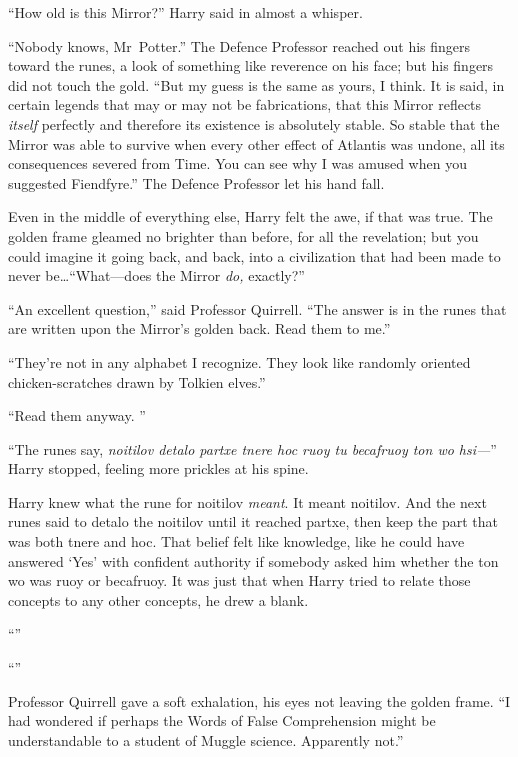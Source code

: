 “How old is this Mirror?” Harry said in almost a whisper.

“Nobody knows, Mr~Potter.” The Defence Professor reached out his fingers toward the runes, a look of something like reverence on his face; but his fingers did not touch the gold. “But my guess is the same as yours, I think. It is said, in certain legends that may or may not be fabrications, that this Mirror reflects \emph{itself} perfectly and therefore its existence is absolutely stable. So stable that the Mirror was able to survive when every other effect of Atlantis was undone, all its consequences severed from Time. You can see why I was amused when you suggested Fiendfyre.” The Defence Professor let his hand fall.

Even in the middle of everything else, Harry felt the awe, if that was true. The golden frame gleamed no brighter than before, for all the revelation; but you could imagine it going back, and back, into a civilization that had been made to never be…“What—does the Mirror \emph{do,} exactly?”

“An excellent question,” said Professor Quirrell. “The answer is in the runes that are written upon the Mirror’s golden back. Read them to me.”

“They’re not in any alphabet I recognize. They look like randomly oriented chicken-scratches drawn by Tolkien elves.”

“Read them anyway. ”

“The runes say, \emph{noitilov detalo partxe tnere hoc ruoy tu becafruoy ton wo hsi—}” Harry stopped, feeling more prickles at his spine.

Harry knew what the rune for noitilov \emph{meant}. It meant noitilov. And the next runes said to detalo the noitilov until it reached partxe, then keep the part that was both tnere and hoc. That belief felt like knowledge, like he could have answered ‘Yes’ with confident authority if somebody asked him whether the ton wo was ruoy or becafruoy. It was just that when Harry tried to relate those concepts to any other concepts, he drew a blank.

“”

“”

Professor Quirrell gave a soft exhalation, his eyes not leaving the golden frame. “I had wondered if perhaps the Words of False Comprehension might be understandable to a student of Muggle science. Apparently not.”

